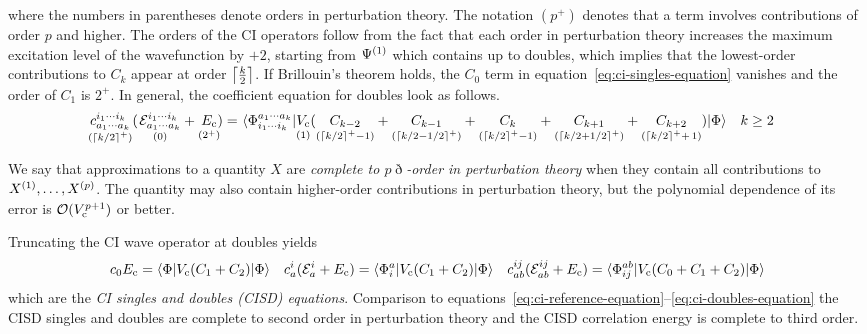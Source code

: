 \documentclass[11pt]{article}
\numberwithin{equation}{section}
\begin{document}
\begin{rmk}
where the numbers in parentheses denote orders in perturbation theory.
The notation
$
  (p^+)
$
denotes that a term involves contributions of order $p$ and higher.
The orders of the CI operators follow from the fact that each order in perturbation theory increases the maximum excitation level of the wavefunction by $+2$, starting from $\Psi ^{(1)}$ which contains up to doubles, which implies that the lowest-order contributions to $C_k$ appear at order $\left\lceil\frac{k}{2}\right\rceil$.
If Brillouin's theorem holds, the $C_0$ term in equation~\ref{eq:ci-singles-equation} vanishes and the order of $C_1$ is $2^+$.
In general, the coefficient equation for doubles look as follows.
\begin{align}
  \underset{(\left\lceil k/2\right\rceil^+)}{\vphantom{(}
  c_{a_1\cdots a_k}^{i_1\cdots i_k}
  }
  (\hspace{1pt}
  \underset{(0)}{\vphantom{(}
    \mathcal{E}_{a_1\cdots a_k}^{i_1\cdots i_k}
  }
  +
  \underset{(2^+)}{\vphantom{(}
    E_{\mathrm{c}}
  }
  \hspace{-2pt}
  )
=&\
  \langle\Phi _{i_1\cdots i_k}^{a_1\cdots a_k}|
  \underset{(1)}{\vphantom{(}
    V_{\mathrm{c}}
  }
    (
    \underset{(\left\lceil k/2\right\rceil^+-1)}{\vphantom{(}
      C_{k-2}
    }
    +
    \underset{(\left\lceil k/2-1/2\right\rceil^+)}{\vphantom{(}
      C_{k-1}
    }
    +
    \underset{(\left\lceil k/2\right\rceil^+-1)}{\vphantom{(}
      C_k
    }
    +
    \underset{(\left\lceil k/2+1/2\right\rceil^+)}{\vphantom{(}
      C_{k+1}
    }
    +
    \underset{(\left\lceil k/2\right\rceil^++\,1)}{\vphantom{(}
      C_{k+2}
    }
    )
  |\Phi \rangle
&&
  k
\geq
  2
\end{align}
\end{rmk}

\begin{dfn}
We say that approximations to a quantity $X$ are \textit{complete to $p\eth$-order in perturbation theory} when they contain all contributions to $X^{(1)},\ldots,X^{(p)}$.
The quantity may also contain higher-order contributions in perturbation theory, but the  polynomial dependence of its error is $\mathcal{O}(V_{\mathrm{c}}^{p+1})$ or better.
\end{dfn}

\begin{dfn}
Truncating the CI wave operator at doubles yields
\begin{align}
  c_0
    E_{\mathrm{c}}
=
  \langle\Phi |
    V_{\mathrm{c}}
    (
      C_1
    +
      C_2
    )
  |\Phi \rangle
&&
  c_a^i
  (
    \mathcal{E}_a^i
  +
    E_{\mathrm{c}}
  )
=
  \langle\Phi _i^a|
    V_{\mathrm{c}}
    (
      C_1
    +
      C_2
    )
  |\Phi \rangle
&&
  c_{ab}^{ij}
  (
    \mathcal{E}_{ab}^{ij}
  +
    E_{\mathrm{c}}
  )
=
  \langle\Phi _{ij}^{ab}|
    V_{\mathrm{c}}
    (
      C_0
    +
      C_1
    +
      C_2
    )
  |\Phi \rangle
\end{align}
which are
the \textit{CI singles and doubles (CISD) equations}.
Comparison to equations~\ref{eq:ci-reference-equation}--\ref{eq:ci-doubles-equation} the CISD singles and doubles are complete to second order in perturbation theory and the CISD correlation energy is complete to third order.

\end{dfn}
\end{document}
